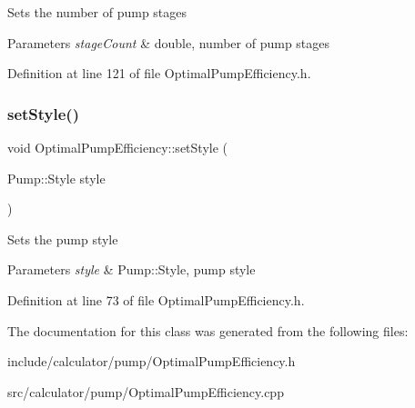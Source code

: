 Sets the number of pump stages 
\begin{DoxyParams}{Parameters}
{\em stage\+Count} & double, number of pump stages \\
\hline
\end{DoxyParams}


Definition at line 121 of file Optimal\+Pump\+Efficiency.\+h.

\mbox{\label{class_optimal_pump_efficiency_ab6b85c8c08d6641c5375c65436f16a2f}} 
\subsubsection{\texorpdfstring{set\+Style()}{setStyle()}}
{\footnotesize\ttfamily void Optimal\+Pump\+Efficiency\+::set\+Style (\begin{DoxyParamCaption}\item[{Pump\+::\+Style}]{style }\end{DoxyParamCaption})\hspace{0.3cm}{\ttfamily [inline]}}

Sets the pump style 
\begin{DoxyParams}{Parameters}
{\em style} & Pump\+::\+Style, pump style \\
\hline
\end{DoxyParams}


Definition at line 73 of file Optimal\+Pump\+Efficiency.\+h.



The documentation for this class was generated from the following files\+:\begin{DoxyCompactItemize}
\item 
include/calculator/pump/Optimal\+Pump\+Efficiency.\+h\item 
src/calculator/pump/Optimal\+Pump\+Efficiency.\+cpp\end{DoxyCompactItemize}

